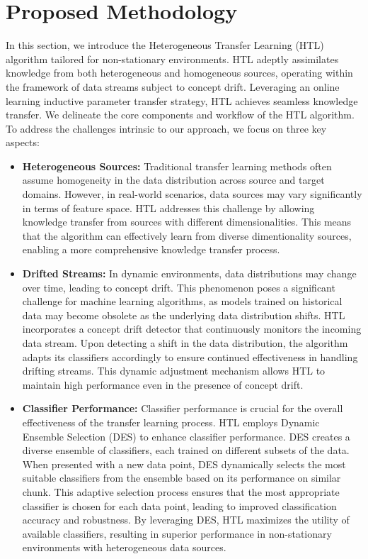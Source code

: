 \section{Proposed Methodology}\label{sec:6_third_proposed_approach}

In this section, we introduce the Heterogeneous Transfer Learning (HTL) algorithm tailored for non-stationary environments. HTL adeptly assimilates knowledge from both heterogeneous and homogeneous sources, operating within the framework of data streams subject to concept drift. Leveraging an online learning inductive parameter transfer strategy, HTL achieves seamless knowledge transfer. We delineate the core components and workflow of the HTL algorithm. To address the challenges intrinsic to our approach, we focus on three key aspects:
\begin{itemize}
	\item \textbf{Heterogeneous Sources:} Traditional transfer learning methods often assume homogeneity in the data distribution across source and target domains. However, in real-world scenarios, data sources may vary significantly in terms of feature space. HTL addresses this challenge by allowing knowledge transfer from sources with different dimensionalities. This means that the algorithm can effectively learn from diverse dimentionality sources, enabling a more comprehensive knowledge transfer process.
	\item \textbf{Drifted Streams:} In dynamic environments, data distributions may change over time, leading to concept drift. This phenomenon poses a significant challenge for machine learning algorithms, as models trained on historical data may become obsolete as the underlying data distribution shifts. HTL incorporates a concept drift detector that continuously monitors the incoming data stream. Upon detecting a shift in the data distribution, the algorithm adapts its classifiers accordingly to ensure continued effectiveness in handling drifting streams. This dynamic adjustment mechanism allows HTL to maintain high performance even in the presence of concept drift.
	\item \textbf{Classifier Performance:} Classifier performance is crucial for the overall effectiveness of the transfer learning process. HTL employs Dynamic Ensemble Selection (DES) to enhance classifier performance. DES creates a diverse ensemble of classifiers, each trained on different subsets of the data. When presented with a new data point, DES dynamically selects the most suitable classifiers from the ensemble based on its performance on similar chunk. This adaptive selection process ensures that the most appropriate classifier is chosen for each data point, leading to improved classification accuracy and robustness. By leveraging DES, HTL maximizes the utility of available classifiers, resulting in superior performance in non-stationary environments with heterogeneous data sources.
\end{itemize}

